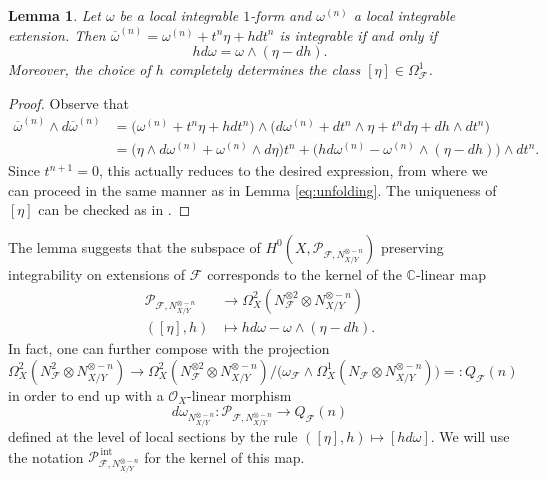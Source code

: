 \documentclass[reqno]{amsart}
\theoremstyle{plain}
\newcommand\C{\mathbb{C}}
\newcommand{\OO}{\mathcal{O}}
\newcommand{\F}{\mathscr{F}}
\newcommand{\PP}{\mathcal{P}}
\DeclareMathOperator{\Int}{int}
\newtheorem{lemma}[theorem]{Lemma}
\theoremstyle{definition}
\theoremstyle{named}
\begin{document}
\begin{lemma} \label{eq:integrabilidad}
    Let $\omega$ be a local integrable $1$-form and $\omega^{(n)}$ a local integrable extension. Then $\overline{\omega}^{(n)}=\omega^{(n)} + t^{n} \eta + h dt^n$ is integrable if and only if 
    $$ h d\omega = \omega \wedge ( \eta-dh).$$
    Moreover, the choice of $h$ completely determines the class $[\eta]\in \Omega^1_\F$.
\end{lemma}
\begin{proof}
Observe that 
\begin{align*}\overline{\omega}^{(n)}\wedge d\overline{\omega}^{(n)} &= \big(\omega^{(n)} + t^n \eta + h dt^n\big)\wedge \big(d\omega^{(n)} + dt^n\wedge \eta + t^n d\eta + dh\wedge dt^n\big)  \\
&= \Big( \eta\wedge d\omega^{(n)} + \omega^{(n)}\wedge d\eta\Big)t^n + \Big(h d\omega^{(n)} - \omega^{(n)}\wedge (\eta-dh)\Big)\wedge dt^n. 
\end{align*}
Since $t^{n+1}=0$, this actually reduces to the desired expression, from where we can proceed in the same manner as in Lemma \ref{eq:unfolding}. The uniqueness of $[\eta]$ can be checked as in \cite{suwa1992unfoldings}.
\end{proof}
The lemma suggests that the subspace of $H^0(X,\PP_{\F,N_{X/Y}^{\otimes - n}})$ preserving integrability on extensions of $\F$ corresponds to the kernel of the $\C$-linear map 
\begin{align*}
   \PP_{\F,N_{X/Y}^{\otimes -n}} & \longrightarrow \Omega^2_X(N_\F^{\otimes 2}\otimes N_{X/Y}^{\otimes -n}) \\
    ([\eta],h) &\longmapsto h d\omega - \omega \wedge ( \eta-dh).
\end{align*}
In fact, one can further compose with the projection 
\begin{equation}\label{def:QF}
\Omega^2_X(N_\F^2\otimes N_{X/Y}^{\otimes - n}) \to \Omega^2_X(N_\F^{\otimes 2}\otimes N_{X/Y}^{\otimes - n}) / \big(\omega_\F\wedge \Omega^1_X(N_\F\otimes N_{X/Y}^{\otimes - n})\big)=:Q_{\F}(n) 
\end{equation}
in order to end up with a $\OO_X$-linear morphism
\[
    d\omega_{N_{X/Y}^{\otimes - n}}: \PP_{\F,N_{X/Y}^{\otimes - n}}  \longrightarrow Q_\F(n)
\]
defined at the level of local sections by the rule $([\eta],h)\mapsto [h d\omega]$.
We will use the notation $\PP_{\F,N_{X/Y}^{\otimes - n}}^{\,\Int}$ for the kernel of this map. 
\end{document}
